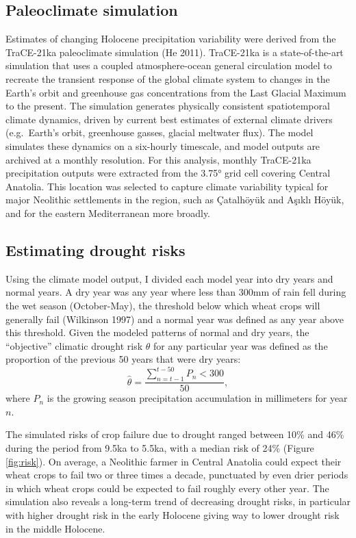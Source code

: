 \documentclass[smallextended]{svjour3}       %
\begin{document}
\hypertarget{paleoclimate-simulation}{%
\subsection{Paleoclimate simulation}\label{paleoclimate-simulation}}

Estimates of changing Holocene precipitation variability were derived from the TraCE-21ka paleoclimate simulation (He 2011). TraCE-21ka is a state-of-the-art simulation that uses a coupled atmosphere-ocean general circulation model to recreate the transient response of the global climate system to changes in the Earth's orbit and greenhouse gas concentrations from the Last Glacial Maximum to the present. The simulation generates physically consistent spatiotemporal climate dynamics, driven by current best estimates of external climate drivers (e.g.~Earth's orbit, greenhouse gasses, glacial meltwater flux). The model simulates these dynamics on a six-hourly timescale, and model outputs are archived at a monthly resolution. For this analysis, monthly TraCE-21ka precipitation outputs were extracted from the 3.75° grid cell covering Central Anatolia. This location was selected to capture climate variability typical for major Neolithic settlements in the region, such as Çatalhöyük and Aşıklı Höyük, and for the eastern Mediterranean more broadly.

\hypertarget{estimating-drought-risks}{%
\subsection{Estimating drought risks}\label{estimating-drought-risks}}

Using the climate model output, I divided each model year into dry years and normal years. A dry year was any year where less than 300mm of rain fell during the wet season (October-May), the threshold below which wheat crops will generally fail (Wilkinson 1997) and a normal year was defined as any year above this threshold. Given the modeled patterns of normal and dry years, the ``objective'' climatic drought risk \(\hat\theta\) for any particular year was defined as the proportion of the previous 50 years that were dry years:
\begin{equation}
    \hat\theta = \frac{\sum_{n=t-1}^{t-50} P_n < 300}{50},
\end{equation}
where \(P_n\) is the growing season precipitation accumulation in millimeters for year \(n\).

The simulated risks of crop failure due to drought ranged between 10\% and 46\% during the period from 9.5ka to 5.5ka, with a median risk of 24\% (Figure \ref{fig:risk}). On average, a Neolithic farmer in Central Anatolia could expect their wheat crops to fail two or three times a decade, punctuated by even drier periods in which wheat crops could be expected to fail roughly every other year. The simulation also reveals a long-term trend of decreasing drought risks, in particular with higher drought risk in the early Holocene giving way to lower drought risk in the middle Holocene.
\end{document}
